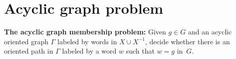 \documentclass[10pt]{amsart}
\theoremstyle{definition}
\newtheorem{proposition}[theorem]{Proposition}
\def\P{{\mathbf{P}}}
\def\SSP{{\mathbf{SSP}}}
\def\BSMP{{\mathbf{BSMP}}}
\def\BKP{{\mathbf{BKP}}}
\def\KP{{\mathbf{KP}}}
\def\IKP{{\mathbf{IKP}}}
\def\SSOP{{\mathbf{SSOP}}}
\def\BSMOP{{\mathbf{BSMOP}}}
\begin{document}
%
%
%
%

\section{Acyclic graph problem}\label{sec:agp}
\medskip
\noindent
{\bf The acyclic graph membership problem:} Given $g\in G$ and an acyclic oriented graph $\Gamma$ labeled by words in $X\cup X^{-1}$, decide whether there is an oriented path in $\Gamma$ labeled by a word $w$ such that $w=g$ in~$G$.
\end{document}
